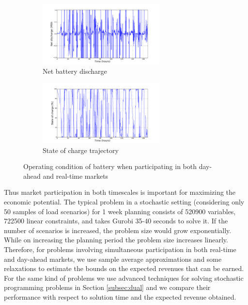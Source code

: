 \documentclass[11pt,twoside]{article}
\begin{document}
\begin{figure}[h!]
\begin{subfigure}{\textwidth}
\centering
\includegraphics[width=0.7\textwidth]{Figures/Plots/fullproblem_stoch/netpower_fp_st.pdf} \caption{Net battery discharge}\label{fig:netpower_fp_st}
\end{subfigure}
\begin{subfigure}{\textwidth}
\centering
\includegraphics[width=0.7\textwidth]{Figures/Plots/fullproblem_stoch/soc_fp_st.pdf} \caption{State of charge trajectory}\label{fig:soc_fp_st}
\end{subfigure}
\caption{Operating condition of battery when participating in both day-ahead and real-time markets}
\end{figure}
Thus market participation in both timescales is important for maximizing the economic potential. The typical problem in a stochastic setting (considering only 50 samples of load scenarios) for 1 week planning consists of 520900 variables, 722500 linear constraints, and takes Gurobi 35-40 seconds to solve it. 
If the number of scenarios is increased, the problem size would grow exponentially. While on increasing the planning period the problem size increases linearly. Therefore, for problems involving simultaneous participation in both real-time and day-ahead markets, we use sample average approximations and some relaxations to estimate the bounds on the expected revenues that can be earned. For the same kind of problems we use advanced techniques for solving stochastic programming problems in Section \ref{subsec:dual} and we compare their performance with respect to solution time and the expected revenue obtained.
\end{document}
